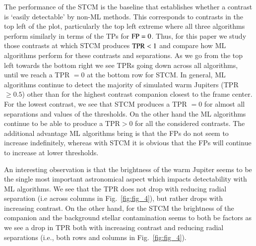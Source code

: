 \documentclass{aa}
\begin{document}
The performance of the STCM is the baseline that establishes whether a contrast is `easily detectable' by non-ML methods. 
This corresponds to contrasts in the top left of the plot, particularly the top left extreme where all three algorithms perform similarly in terms of the TPs for ${\rm FP}=0$.
Thus, for this paper we study those contrasts at which STCM produces ${\rm TPR}<1$ and compare how ML algorithms perform for these contrasts and separations.
As we go from the top left towards the bottom right we see TPRs going down across all algorithms, until we reach a TPR $=0$ at the bottom row for STCM. 
In general, ML algorithms continue to detect the majority of simulated warm Jupiters (TPR $\ge 0.5$) other than for the highest contrast companion closest to the frame center.
For the lowest contrast, we see that STCM produces a TPR $=0$ for almost all separations and values of the thresholds.
On the other hand the ML algorithms continue to be able to produce a TPR$>0$ for all the considered contrasts.
The additional advantage ML algorithms bring is that the FPs do not seem to increase indefinitely, whereas with STCM it is obvious that the FPs will continue to increase at lower thresholds.

An interesting observation is that the brightness of the warm Jupiter seems to be the single most important astronomical aspect which impacts detectability with ML algorithms.
We see that the TPR does not drop with reducing radial separation (i.e across columns in Fig.~\ref{fig:fig_4}), but rather drops with increasing contrast. 
On the other hand, for the STCM the brightness of the companion and the background stellar contamination seems to both be factors as we see a drop in TPR both with increasing contrast and reducing radial separations (i.e., both rows and columns in Fig.~\ref{fig:fig_4}).

\end{document}
